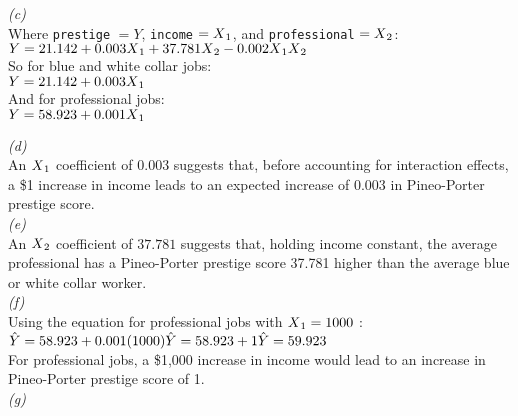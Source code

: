 \documentclass[12pt,letterpaper]{article}
\begin{document}
\noindent\textit{(c)}\\

\noindent Where \texttt{prestige} $= Y$, \texttt{income} $= X\textsubscript{1}$, and \texttt{professional} $= X\textsubscript{2}$:\\

$Y = 21.142 + 0.003X\textsubscript{1} + 37.781X\textsubscript{2} - 0.002X\textsubscript{1}X\textsubscript{2}$\\

\noindent So for blue and white collar jobs:\\

$Y = 21.142 + 0.003X\textsubscript{1}$\\

\noindent And for professional jobs:\\

$Y = 58.923 + 0.001X\textsubscript{1}$\\

\clearpage

\noindent\textit{(d)}\\

\noindent An $X\textsubscript{1}$ coefficient of $0.003$ suggests that, before accounting for interaction effects, a \$1 increase in income leads to an expected increase of 0.003 in Pineo-Porter prestige score. \\

\noindent\textit{(e)}\\

\noindent An $X\textsubscript{2}$ coefficient of $37.781$ suggests that, holding income constant, the average professional has a Pineo-Porter prestige score 37.781 higher than the average blue or white collar worker. \\

\noindent\textit{(f)}\\

\noindent Using the equation for professional jobs with $X\textsubscript{1} = 1000$ :\\

\noindent $\hat{Y} = 58.923 + 0.001(1000)\\
\hat{Y} = 58.923 + 1\\
\hat{Y} = 59.923$\\

\noindent For professional jobs, a \$1,000 increase in income would lead to an increase in Pineo-Porter prestige score of 1.\\

\noindent\textit{(g)}\\
\end{document}
